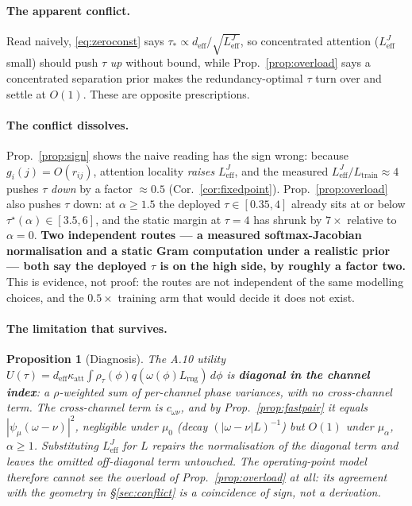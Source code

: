 \documentclass[11pt]{article}
\newtheorem{proposition}[theorem]{Proposition}
\theoremstyle{definition}
\newcommand{\deff}{d_{\mathrm{eff}}}
\newcommand{\Ltr}{L_{\mathrm{train}}}
\newcommand{\Leff}{L_{\mathrm{eff}}^{J}}
\begin{document}
\paragraph{The apparent conflict.} Read naively, \eqref{eq:zeroconst} says
$\tau_*\propto\deff/\sqrt{\Leff}$, so concentrated attention ($\Leff$ small) should push $\tau$
\emph{up} without bound, while Prop.~\ref{prop:overload} says a concentrated separation prior makes
the redundancy-optimal $\tau$ turn over and settle at $O(1)$. These are opposite prescriptions.

\paragraph{The conflict dissolves.} Prop.~\ref{prop:sign} shows the naive reading has the sign
wrong: because $g_i(j)=O(r_{ij})$, attention locality \emph{raises} $\Leff$, and the measured
$\Leff/\Ltr\approx4$ pushes $\tau$ \emph{down} by a factor $\approx0.5$
(Cor.~\ref{cor:fixedpoint}). Prop.~\ref{prop:overload} also pushes $\tau$ down: at $\alpha\ge1.5$
the deployed $\tau\in[0.35,4]$ already sits at or below $\tau^\star(\alpha)\in[3.5,6]$, and the
static margin at $\tau=4$ has shrunk by $7\times$ relative to $\alpha{=}0$. \textbf{Two independent
routes --- a measured softmax-Jacobian normalisation and a static Gram computation under a
realistic prior --- both say the deployed $\tau$ is on the high side, by roughly a factor two.}
This is evidence, not proof: the routes are not independent of the same modelling choices, and the
$0.5\times$ training arm that would decide it does not exist.

\paragraph{The limitation that survives.}

\begin{proposition}[Diagnosis]\label{prop:diagnosis}
The A.10 utility $U(\tau)=\deff\kappa_{\mathrm{att}}\int\rho_\tau(\phi)q(\omega(\phi)L_{\mathrm{rng}})\,d\phi$
is \textbf{diagonal in the channel index}: a $\rho$-weighted sum of per-channel phase variances,
with no cross-channel term. The cross-channel term is $c_{\omega\nu}$, and by
Prop.~\ref{prop:fastpair} it equals $|\psi_\mu(\omega-\nu)|^2$, negligible under $\mu_0$
(decay $(|\omega-\nu|L)^{-1}$) but $O(1)$ under $\mu_\alpha$, $\alpha\ge1$. Substituting $\Leff$
for $L$ repairs the \emph{normalisation} of the diagonal term and leaves the \emph{omitted}
off-diagonal term untouched. The operating-point model therefore cannot see the overload of
Prop.~\ref{prop:overload} at all: its agreement with the geometry in \S\ref{sec:conflict} is a
coincidence of sign, not a derivation.
\end{proposition}
\end{document}
